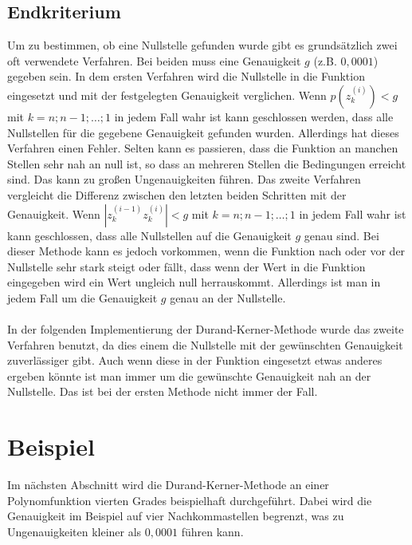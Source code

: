 \documentclass[12pt]{article}
\begin{document}
\subsection{Endkriterium}
Um zu bestimmen, ob eine Nullstelle gefunden wurde gibt es grundsätzlich zwei oft verwendete Verfahren. Bei beiden muss eine Genauigkeit $g$ (z.B. $0,0001$) gegeben sein. 
In dem ersten Verfahren wird die Nullstelle in die Funktion eingesetzt und mit der festgelegten Genauigkeit verglichen. Wenn $p(z_k^{(i)}) < g$ mit $k=n;n-1;\dots ;1$ in jedem Fall wahr ist kann geschlossen werden, dass alle Nullstellen für die gegebene Genauigkeit gefunden wurden. Allerdings hat dieses Verfahren einen Fehler. Selten kann es passieren, dass die Funktion an manchen Stellen sehr nah an null ist, so dass an mehreren Stellen die Bedingungen erreicht sind. Das kann zu großen Ungenauigkeiten führen. Das zweite Verfahren vergleicht die Differenz zwischen den letzten beiden Schritten mit der Genauigkeit. Wenn $|z_k^{(i-1)}z_k^{(i)}| < g$ mit $k=n;n-1;\dots ;1$ in jedem Fall wahr ist kann geschlossen, dass alle Nullstellen auf die Genauigkeit $g$ genau sind. Bei dieser Methode kann es jedoch vorkommen, wenn die Funktion nach oder vor der Nullstelle sehr stark steigt oder fällt, dass wenn der Wert in die Funktion eingegeben wird ein Wert ungleich null herrauskommt. Allerdings ist man in jedem Fall um die Genauigkeit $g$ genau an der Nullstelle.\\\\
In der folgenden Implementierung der Durand-Kerner-Methode wurde das zweite Verfahren benutzt, da dies einem die Nullstelle mit der gewünschten Genauigkeit zuverlässiger gibt. Auch wenn diese in der Funktion eingesetzt etwas anderes ergeben könnte ist man immer um die gewünschte Genauigkeit nah an der Nullstelle. Das ist bei der ersten Methode nicht immer der Fall.

\section{Beispiel}
Im nächsten Abschnitt wird die Durand-Kerner-Methode an einer Polynomfunktion vierten Grades beispielhaft durchgeführt. Dabei wird die Genauigkeit im Beispiel auf vier Nachkommastellen begrenzt, was zu Ungenauigkeiten kleiner als $0,0001$ führen kann.
\end{document}

